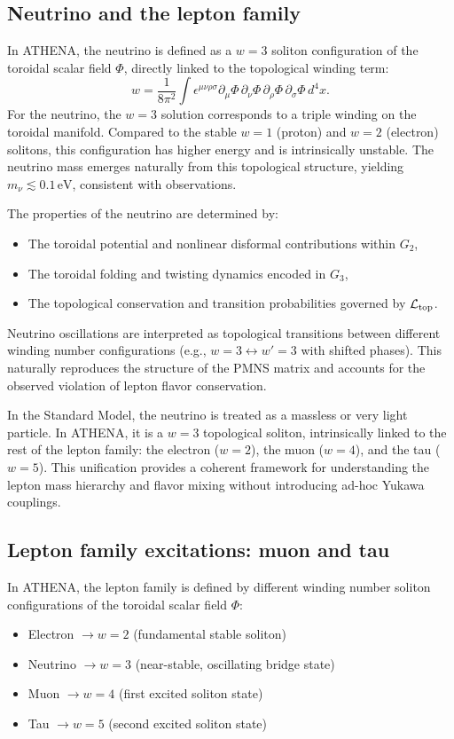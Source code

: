 \documentclass[11pt,a4paper]{article}
\begin{document}
\subsection{Neutrino and the lepton family}
\label{subsec:neutrino}
In ATHENA, the neutrino is defined as a \(w=3\) soliton configuration of the toroidal scalar field \(\Phi\), directly linked to the topological winding term:
\[
w = \frac{1}{8\pi^2} \int \epsilon^{\mu\nu\rho\sigma} \partial_\mu \Phi \, \partial_\nu \Phi \, \partial_\rho \Phi \, \partial_\sigma \Phi \, d^4x.
\]
For the neutrino, the \(w=3\) solution corresponds to a triple winding on the toroidal manifold. Compared to the stable \(w=1\) (proton) and \(w=2\) (electron) solitons, this configuration has higher energy and is intrinsically unstable. The neutrino mass emerges naturally from this topological structure, yielding \(m_\nu \lesssim 0.1\,\mathrm{eV}\), consistent with observations.

The properties of the neutrino are determined by:
\begin{itemize}
    \item The toroidal potential and nonlinear disformal contributions within \(G_2\),
    \item The toroidal folding and twisting dynamics encoded in \(G_3\),
    \item The topological conservation and transition probabilities governed by \(\mathcal{L}_{\rm top}\).
\end{itemize}
Neutrino oscillations are interpreted as topological transitions between different winding number configurations (e.g., \(w=3 \leftrightarrow w'=3\) with shifted phases). This naturally reproduces the structure of the PMNS matrix and accounts for the observed violation of lepton flavor conservation.

In the Standard Model, the neutrino is treated as a massless or very light particle. In ATHENA, it is a \(w=3\) topological soliton, intrinsically linked to the rest of the lepton family: the electron (\(w=2\)), the muon (\(w=4\)), and the tau (\(w=5\)). This unification provides a coherent framework for understanding the lepton mass hierarchy and flavor mixing without introducing ad-hoc Yukawa couplings.

\subsection{Lepton family excitations: muon and tau}
\label{subsec:muon_tau}
In ATHENA, the lepton family is defined by different winding number soliton configurations of the toroidal scalar field \(\Phi\):
\begin{itemize}
    \item Electron \(\rightarrow w = 2\) (fundamental stable soliton)
    \item Neutrino \(\rightarrow w = 3\) (near-stable, oscillating bridge state)
    \item Muon \(\rightarrow w = 4\) (first excited soliton state)
    \item Tau \(\rightarrow w = 5\) (second excited soliton state)
\end{itemize}
\end{document}
